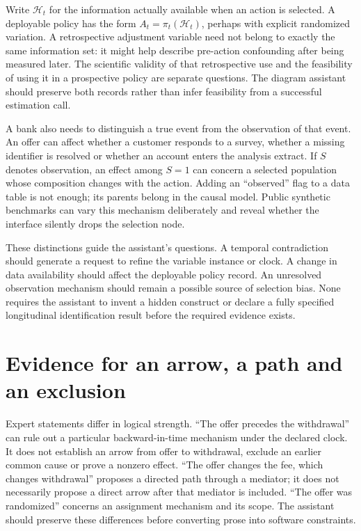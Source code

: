 Write \(\mathcal H_t\) for the information actually available when an
action is selected. A deployable policy has the form
\(A_t=\pi_t(\mathcal H_t)\), perhaps with explicit randomized variation.
A retrospective adjustment variable need not belong to exactly the same
information set: it might help describe pre-action confounding after
being measured later. The scientific validity of that retrospective use
and the feasibility of using it in a prospective policy are separate
questions. The diagram assistant should preserve both records rather
than infer feasibility from a successful estimation call.

A bank also needs to distinguish a true event from the observation of
that event. An offer can affect whether a customer responds to a survey,
whether a missing identifier is resolved or whether an account enters
the analysis extract. If \(S\) denotes observation, an effect among
\(S=1\) can concern a selected population whose composition changes with
the action. Adding an ``observed'' flag to a data table is not enough;
its parents belong in the causal model. Public synthetic benchmarks can
vary this mechanism deliberately and reveal whether the interface
silently drops the selection node.

These distinctions guide the assistant's questions. A temporal
contradiction should generate a request to refine the variable instance
or clock. A change in data availability should affect the deployable
policy record. An unresolved observation mechanism should remain a
possible source of selection bias. None requires the assistant to invent
a hidden construct or declare a fully specified longitudinal
identification result before the required evidence exists.

\hypertarget{evidence-for-an-arrow-a-path-and-an-exclusion}{%
\section{Evidence for an arrow, a path and an
exclusion}\label{evidence-for-an-arrow-a-path-and-an-exclusion}}

Expert statements differ in logical strength. ``The offer precedes the
withdrawal'' can rule out a particular backward-in-time mechanism under
the declared clock. It does not establish an arrow from offer to
withdrawal, exclude an earlier common cause or prove a nonzero effect.
``The offer changes the fee, which changes withdrawal'' proposes a
directed path through a mediator; it does not necessarily propose a
direct arrow after that mediator is included. ``The offer was
randomized'' concerns an assignment mechanism and its scope. The
assistant should preserve these differences before converting prose into
software constraints.

